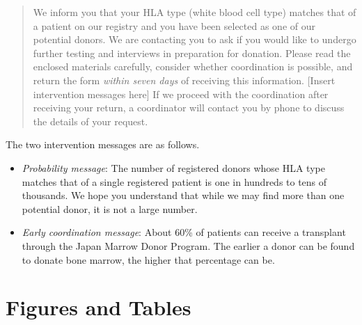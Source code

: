 \documentclass[12pt, a4paper]{article}
\providecommand{\tightlist}{%
  \setlength{\itemsep}{0pt}\setlength{\parskip}{0pt}}
\begin{document}
\begin{quote}
We inform you that your HLA type (white blood cell type) matches that of a patient on our registry and you have been selected as one of our potential donors. We are contacting you to ask if you would like to undergo further testing and interviews in preparation for donation. Please read the enclosed materials carefully, consider whether coordination is possible, and return the form \emph{within seven days} of receiving this information. {[}Insert intervention messages here{]} If we proceed with the coordination after receiving your return, a coordinator will contact you by phone to discuss the details of your request.
\end{quote}

The two intervention messages are as follows.

\begin{itemize}
\tightlist
\item
  \emph{Probability message}: The number of registered donors whose HLA type matches that of a single registered patient is one in hundreds to tens of thousands. We hope you understand that while we may find more than one potential donor, it is not a large number.
\item
  \emph{Early coordination message}: About 60\% of patients can receive a transplant through the Japan Marrow Donor Program. The earlier a donor can be found to donate bone marrow, the higher that percentage can be.
\end{itemize}

\setcounter{figure}{0}
\setcounter{table}{0}
\renewcommand\thefigure{\thesection\arabic{figure}}
\renewcommand{\thetable}{\thesection\arabic{table}}
\renewcommand{\theHfigure}{\thesection\arabic{figure}}
\renewcommand{\theHtable}{\thesection\arabic{table}}

\hypertarget{figtab}{%
\section{Figures and Tables}\label{figtab}}
\end{document}
